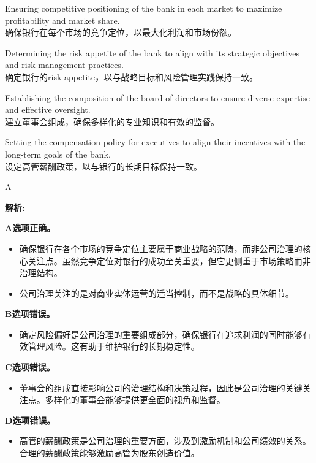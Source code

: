 \documentclass{article}
\newenvironment{explanation}
{\textbf{解析:}\par}
{\par}
\begin{document}
    \begin{choices}
    \item Ensuring competitive positioning of the bank in each market to maximize profitability and market share. \\
    确保银行在每个市场的竞争定位，以最大化利润和市场份额。
    
    \item Determining the risk appetite of the bank to align with its strategic objectives and risk management practices. \\
    确定银行的risk appetite，以与战略目标和风险管理实践保持一致。
    
    \item Establishing the composition of the board of directors to ensure diverse expertise and effective oversight. \\
    建立董事会组成，确保多样化的专业知识和有效的监督。
    
    \item Setting the compensation policy for executives to align their incentives with the long-term goals of the bank. \\
    设定高管薪酬政策，以与银行的长期目标保持一致。
    \end{choices}
    
    \begin{correctanswer}
    A
    \end{correctanswer}
    
    \begin{explanation}
    \textbf{A选项正确。}
    \begin{itemize}
        \item 确保银行在各个市场的竞争定位主要属于商业战略的范畴，而非公司治理的核心关注点。虽然竞争定位对银行的成功至关重要，但它更侧重于市场策略而非治理结构。
        \item 公司治理关注的是对商业实体运营的适当控制，而不是战略的具体细节。
    \end{itemize}
    
    \textbf{B选项错误。}
    \begin{itemize}
        \item 确定风险偏好是公司治理的重要组成部分，确保银行在追求利润的同时能够有效管理风险。这有助于维护银行的长期稳定性。
    \end{itemize}
    
    \textbf{C选项错误。}
    \begin{itemize}
        \item 董事会的组成直接影响公司的治理结构和决策过程，因此是公司治理的关键关注点。多样化的董事会能够提供更全面的视角和监督。
    \end{itemize}
    
    \textbf{D选项错误。}
    \begin{itemize}
        \item 高管的薪酬政策是公司治理的重要方面，涉及到激励机制和公司绩效的关系。合理的薪酬政策能够激励高管为股东创造价值。
    \end{itemize}
    \end{explanation}
    
\end{document}
